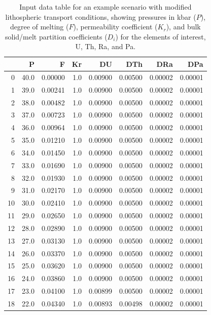 \documentclass[draft]{agujournal2019}
\begin{document}
\begin{table} [H]
\caption{Input data table for an example scenario with modified lithospheric transport conditions, showing pressures in kbar ($P$), degree of melting ($F$), permeability coefficient ($K_r$), and bulk solid/melt partition coefficients ($D_i$) for the elements of interest, U, Th, Ra, and Pa.}
\centering
\begin{tabular}{r | r | r | r | r | r | r | r}
\hline
 & P & F & Kr & DU & DTh & DRa & DPa \\
\hline
0  & 40.0 & 0.00000 & 1.0 & 0.00900 & 0.00500 & 0.00002 & 0.00001 \\
1  & 39.0 & 0.00241 & 1.0 & 0.00900 & 0.00500 & 0.00002 & 0.00001 \\
2  & 38.0 & 0.00482 & 1.0 & 0.00900 & 0.00500 & 0.00002 & 0.00001 \\
3  & 37.0 & 0.00723 & 1.0 & 0.00900 & 0.00500 & 0.00002 & 0.00001 \\
4  & 36.0 & 0.00964 & 1.0 & 0.00900 & 0.00500 & 0.00002 & 0.00001 \\
5  & 35.0 & 0.01210 & 1.0 & 0.00900 & 0.00500 & 0.00002 & 0.00001 \\
6  & 34.0 & 0.01450 & 1.0 & 0.00900 & 0.00500 & 0.00002 & 0.00001 \\
7  & 33.0 & 0.01690 & 1.0 & 0.00900 & 0.00500 & 0.00002 & 0.00001 \\
8  & 32.0 & 0.01930 & 1.0 & 0.00900 & 0.00500 & 0.00002 & 0.00001 \\
9  & 31.0 & 0.02170 & 1.0 & 0.00900 & 0.00500 & 0.00002 & 0.00001 \\
10 & 30.0 & 0.02410 & 1.0 & 0.00900 & 0.00500 & 0.00002 & 0.00001 \\
11 & 29.0 & 0.02650 & 1.0 & 0.00900 & 0.00500 & 0.00002 & 0.00001 \\
12 & 28.0 & 0.02890 & 1.0 & 0.00900 & 0.00500 & 0.00002 & 0.00001 \\
13 & 27.0 & 0.03130 & 1.0 & 0.00900 & 0.00500 & 0.00002 & 0.00001 \\
14 & 26.0 & 0.03370 & 1.0 & 0.00900 & 0.00500 & 0.00002 & 0.00001 \\
15 & 25.0 & 0.03620 & 1.0 & 0.00900 & 0.00500 & 0.00002 & 0.00001 \\
16 & 24.0 & 0.03860 & 1.0 & 0.00900 & 0.00500 & 0.00002 & 0.00001 \\
17 & 23.0 & 0.04100 & 1.0 & 0.00899 & 0.00500 & 0.00002 & 0.00001 \\
18 & 22.0 & 0.04340 & 1.0 & 0.00893 & 0.00498 & 0.00002 & 0.00001 \\

\end{tabular}
\end{table}
\end{document}
